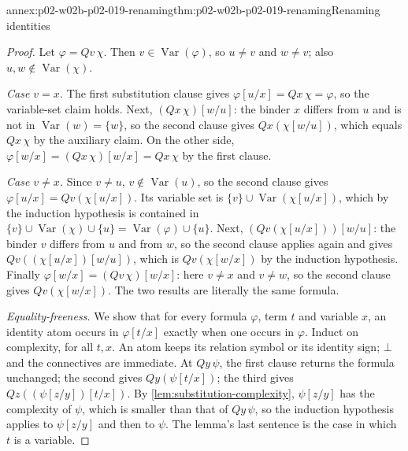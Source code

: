 \begin{annexitem}{annex:p02-w02b-p02-019-renaming}{thm:p02-w02b-p02-019-renaming}{Renaming identities}
\begin{proof}
Let \(\varphi=Qv\,\chi\).  Then \(v\in\operatorname{Var}(\varphi)\), so
\(u\ne v\) and \(w\ne v\); also \(u,w\notin\operatorname{Var}(\chi)\).

\emph{Case \(v=x\).}  The first substitution clause gives
\(\varphi[u/x]=Qx\,\chi=\varphi\), so the variable-set claim holds.  Next,
\((Qx\,\chi)[w/u]\): the binder \(x\) differs from \(u\) and is not in
\(\operatorname{Var}(w)=\{w\}\), so the second clause gives
\(Qx(\chi[w/u])\), which equals \(Qx\,\chi\) by the auxiliary claim.  On the
other side, \(\varphi[w/x]=(Qx\,\chi)[w/x]=Qx\,\chi\) by the first clause.

\emph{Case \(v\ne x\).}  Since \(v\ne u\), \(v\notin\operatorname{Var}(u)\),
so the second clause gives \(\varphi[u/x]=Qv(\chi[u/x])\).  Its variable set
is \(\{v\}\cup\operatorname{Var}(\chi[u/x])\), which by the induction
hypothesis is contained in
\(\{v\}\cup\operatorname{Var}(\chi)\cup\{u\}=\operatorname{Var}(\varphi)\cup\{u\}\).
Next, \((Qv(\chi[u/x]))[w/u]\): the binder \(v\) differs from \(u\) and from
\(w\), so the second clause applies again and gives
\(Qv((\chi[u/x])[w/u])\), which is \(Qv(\chi[w/x])\) by the induction
hypothesis.  Finally \(\varphi[w/x]=(Qv\,\chi)[w/x]\): here \(v\ne x\) and
\(v\ne w\), so the second clause gives \(Qv(\chi[w/x])\).  The two results are
literally the same formula.

\emph{Equality-freeness.}  We show that for every formula \(\varphi\), term
\(t\) and variable \(x\), an identity atom occurs in \(\varphi[t/x]\) exactly
when one occurs in \(\varphi\).  Induct on complexity, for all \(t,x\).  An
atom keeps its relation symbol or its identity sign; \(\bot\) and the
connectives are immediate.  At \(Qy\,\psi\), the first clause returns the
formula unchanged; the second gives \(Qy(\psi[t/x])\); the third gives
\(Qz((\psi[z/y])[t/x])\).  By \cref{lem:substitution-complexity},
\(\psi[z/y]\) has the complexity of \(\psi\), which is smaller than that of
\(Qy\,\psi\), so the induction hypothesis applies to \(\psi[z/y]\) and then
to \(\psi\).  The lemma's last sentence is the case in which \(t\) is a
variable.
\end{proof}
\end{annexitem}

